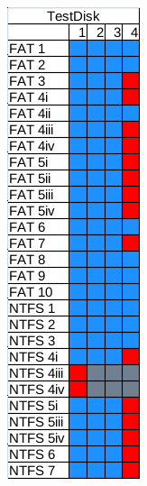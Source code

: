 \begin{figure}
\begin{subfigure}{0.16\linewidth}
    \end{subfigure}
    \begin{subfigure}{0.16\linewidth}
        \includegraphics[width=\linewidth]{fig/testdisk_results.png}

\end{subfigure}
\end{figure}
